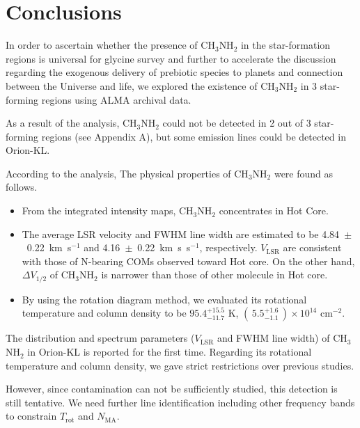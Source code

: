 \chapter{Conclusions
  \label{chap:conclusions}}

In order to ascertain whether the presence of CH$_3$NH$_2$ in the star-formation regions is universal  
for glycine survey and further to accelerate the discussion regarding the exogenous delivery of 
prebiotic species to planets and connection between the Universe and life,
we explored the existence of CH$_3$NH$_2$ in 3 star-forming regions using ALMA archival data.

As a result of the analysis, CH$_3$NH$_2$ could not be detected in 2 out of 3 star-forming regions 
(see Appendix A), but some emission lines could be detected in Orion-KL.

According to the analysis, The physical properties of CH$_3$NH$_2$ were found as follows.
\begin{itemize}
\item From the integrated intensity maps, CH$_3$NH$_2$ concentrates in Hot Core.
\item The average LSR velocity and FWHM line width are estimated to be 4.84~$\pm$~0.22~km~s$^{-1}$ 
and 4.16~$\pm$~0.22~km~s~s$^{-1}$, respectively. $V_{\mathrm{LSR}}$ are consistent with 
those of N-bearing COMs observed toward Hot core.
On the other hand, $\Delta V_{1/2}$ of CH$_3$NH$_2$ is narrower than those of other molecule in Hot core.
\item By using the rotation diagram method, we evaluated its rotational temperature and column density to be $95.4^{+15.5}_{-11.7} \,\,\mathrm{K}$,  $ (\,5.5^{+1.6}_{-1.1}\,) \times 10^{14} \,\,\mathrm{cm^{-2}}$.
\end{itemize}

The distribution and spectrum parameters ($V_{\mathrm{LSR}}$ and FWHM line width) of CH$_3$NH$_2$ in Orion-KL is reported for the first time.
Regarding its rotational temperature and column density, we gave strict restrictions over previous studies.

However, since contamination can not be sufficiently studied, this detection is still tentative.
We need further line identification including other frequency bands to constrain $T_{\mathrm{rot}}$ and $N_{\mathrm{MA}}$.




